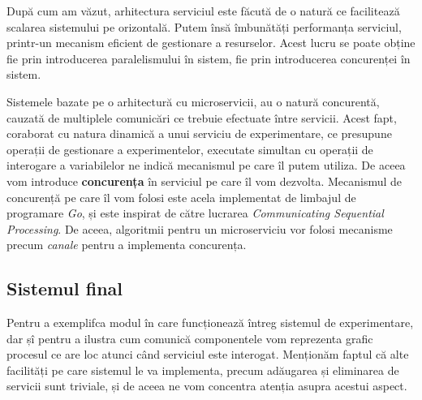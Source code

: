 După cum am văzut, arhitectura serviciul este făcută de o natură ce facilitează scalarea sistemului pe orizontală. Putem însă îmbunătăți  performanța serviciul, printr-un mecanism eficient de gestionare a resurselor. Acest lucru se poate obține fie prin introducerea paralelismului în sistem, fie prin introducerea concurenței în sistem. 

Sistemele bazate pe o arhitectură cu microservicii, au o natură concurentă, cauzată de multiplele comunicări ce trebuie efectuate între servicii. Acest fapt, coraborat cu natura dinamică a unui serviciu de experimentare, ce presupune operații de gestionare a experimentelor, executate simultan cu operații de interogare a variabilelor ne indică mecanismul pe care îl putem utiliza. De aceea vom introduce \textbf{concurența} în serviciul pe care îl vom dezvolta. Mecanismul de concurență pe care îl vom folosi este acela implementat de limbajul de programare \textit{Go}, și este inspirat de către lucrarea \textit{Communicating Sequential Processing}\cite{hoare_csp}. De aceea, algoritmii pentru un microserviciu vor folosi mecanisme precum \textit{canale} pentru a implementa concurența.

\subsection{Sistemul final}

Pentru a exemplifca modul în care funcționează întreg sistemul de experimentare, dar șî pentru a ilustra cum comunică componentele vom reprezenta grafic procesul ce are loc atunci când serviciul este interogat. Menționăm faptul că alte facilități pe care sistemul le va implementa, precum adăugarea și eliminarea de servicii sunt triviale, și de aceea ne vom concentra atenția asupra acestui aspect. 